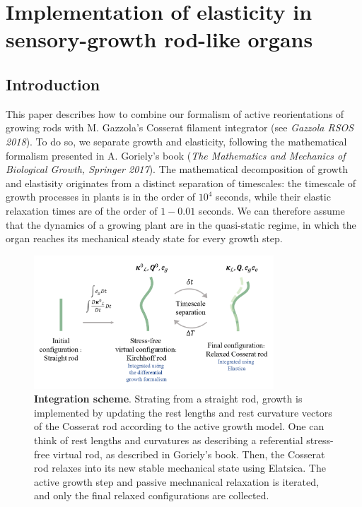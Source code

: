 \documentclass[a4paper, 11pt]{article}
\begin{document}
\section*{Implementation of elasticity in sensory-growth rod-like organs}
\subsection*{Introduction}
This paper describes how to combine our formalism of active reorientations of growing rods with M. Gazzola's Cosserat filament integrator (see \emph{Gazzola RSOS 2018}). To do so, we separate growth and elasticity, following the mathematical formalism presented in A. Goriely's book (\emph{The Mathematics and Mechanics of Biological Growth, Springer 2017}). The mathematical decomposition of growth and elastisity originates from a distinct separation of timescales: the timescale of growth processes in plants is in the order of $10^4$ seconds, while their elastic relaxation times are of the order of $1-0.01$ seconds. We can therefore assume that the dynamics of a growing plant are in the quasi-static regime, in which the organ reaches its mechanical steady state for every growth step.

\begin{figure}[h!]
    \centering
    \includegraphics[width=0.80\textwidth]{growth_concept.png}
    \caption{\textbf{Integration scheme}. Strating from a straight rod, growth is implemented by updating the rest lengths and rest curvature vectors of the Cosserat rod according to the active growth model. One can think of rest lengths and curvatures as describing a referential stress-free virtual rod, as described in Goriely's book. Then, the Cosserat rod relaxes into its new stable mechanical state using Elatsica. The active growth step and passive mechnanical relaxation is iterated, and only the final relaxed configurations are collected.} \label{fig:fig1}
\end{figure}
\end{document}
